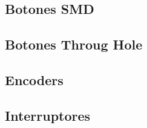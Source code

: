 
\subsection{Botones SMD}


\subsection{Botones Throug Hole}


\subsection{Encoders}


\subsection{Interruptores}
